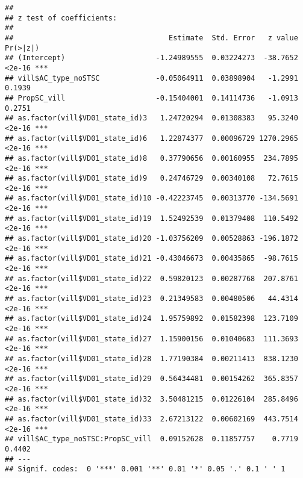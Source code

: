 \documentclass[
]{article}
\newenvironment{Shaded}{\begin{snugshade}}{\end{snugshade}}
\newcommand{\AttributeTok}[1]{\textcolor[rgb]{0.77,0.63,0.00}{#1}}
\newcommand{\FunctionTok}[1]{\textcolor[rgb]{0.00,0.00,0.00}{#1}}
\newcommand{\NormalTok}[1]{#1}
\newcommand{\OtherTok}[1]{\textcolor[rgb]{0.56,0.35,0.01}{#1}}
\newcommand{\SpecialCharTok}[1]{\textcolor[rgb]{0.00,0.00,0.00}{#1}}
\begin{document}
\begin{verbatim}
## 
## z test of coefficients:
## 
##                                    Estimate  Std. Error   z value Pr(>|z|)    
## (Intercept)                     -1.24989555  0.03224273  -38.7652   <2e-16 ***
## vill$AC_type_noSTSC             -0.05064911  0.03898904   -1.2991   0.1939    
## PropSC_vill                     -0.15404001  0.14114736   -1.0913   0.2751    
## as.factor(vill$VD01_state_id)3   1.24720294  0.01308383   95.3240   <2e-16 ***
## as.factor(vill$VD01_state_id)6   1.22874377  0.00096729 1270.2965   <2e-16 ***
## as.factor(vill$VD01_state_id)8   0.37790656  0.00160955  234.7895   <2e-16 ***
## as.factor(vill$VD01_state_id)9   0.24746729  0.00340108   72.7615   <2e-16 ***
## as.factor(vill$VD01_state_id)10 -0.42223745  0.00313770 -134.5691   <2e-16 ***
## as.factor(vill$VD01_state_id)19  1.52492539  0.01379408  110.5492   <2e-16 ***
## as.factor(vill$VD01_state_id)20 -1.03756209  0.00528863 -196.1872   <2e-16 ***
## as.factor(vill$VD01_state_id)21 -0.43046673  0.00435865  -98.7615   <2e-16 ***
## as.factor(vill$VD01_state_id)22  0.59820123  0.00287768  207.8761   <2e-16 ***
## as.factor(vill$VD01_state_id)23  0.21349583  0.00480506   44.4314   <2e-16 ***
## as.factor(vill$VD01_state_id)24  1.95759892  0.01582398  123.7109   <2e-16 ***
## as.factor(vill$VD01_state_id)27  1.15900156  0.01040683  111.3693   <2e-16 ***
## as.factor(vill$VD01_state_id)28  1.77190384  0.00211413  838.1230   <2e-16 ***
## as.factor(vill$VD01_state_id)29  0.56434481  0.00154262  365.8357   <2e-16 ***
## as.factor(vill$VD01_state_id)32  3.50481215  0.01226104  285.8496   <2e-16 ***
## as.factor(vill$VD01_state_id)33  2.67213122  0.00602169  443.7514   <2e-16 ***
## vill$AC_type_noSTSC:PropSC_vill  0.09152628  0.11857757    0.7719   0.4402    
## ---
## Signif. codes:  0 '***' 0.001 '**' 0.01 '*' 0.05 '.' 0.1 ' ' 1
\end{verbatim}

\begin{Shaded}
\end{Shaded}
\end{document}
